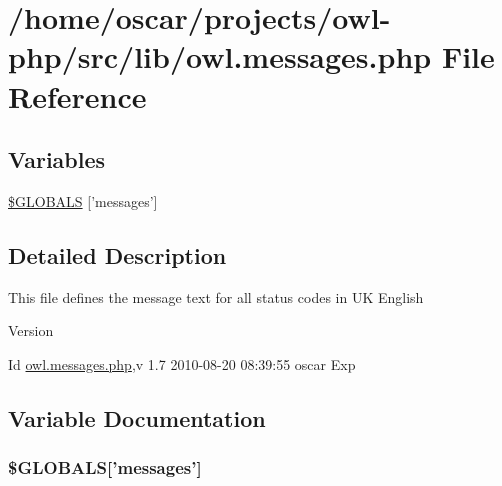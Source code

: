 \section{/home/oscar/projects/owl-\/php/src/lib/owl.messages.php File Reference}
\label{owl_8messages_8php}
\subsection*{Variables}
\begin{DoxyCompactItemize}
\item 
\hyperlink{owl_8messages_8php_a65f2996116eed36e9ab25f254a470259}{\$GLOBALS} \mbox{[}'messages'\mbox{]}
\end{DoxyCompactItemize}


\subsection{Detailed Description}
This file defines the message text for all status codes in UK English \begin{DoxyVersion}{Version}

\end{DoxyVersion}
\begin{DoxyParagraph}{Id}
\hyperlink{owl_8messages_8php}{owl.messages.php},v 1.7 2010-\/08-\/20 08:39:55 oscar Exp 
\end{DoxyParagraph}


\subsection{Variable Documentation}
\subsubsection[{\$GLOBALS}]{\setlength{\rightskip}{0pt plus 5cm}\$GLOBALS\mbox{[}'messages'\mbox{]}}\label{owl_8messages_8php_a65f2996116eed36e9ab25f254a470259}
